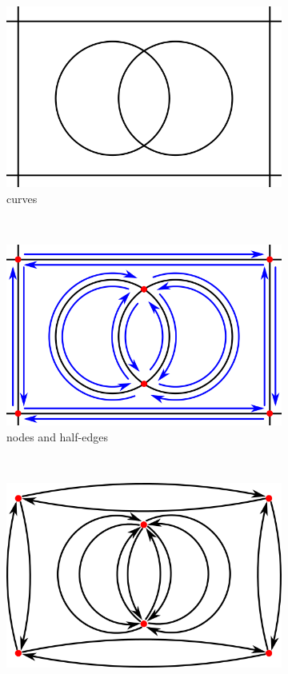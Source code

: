 \begin{figure}%
  \centering
  \begin{subfigure}{.32\textwidth}
    \includegraphics[width=\textwidth]{figures/subd_mdg_a.png}
    \caption{curves} \label{subfig:subd_mdg_a}
  \end{subfigure}%
  ~%
  \begin{subfigure}{.32\textwidth}
    \includegraphics[width=\textwidth]{figures/subd_mdg_b.png}
    \caption{nodes and half-edges} \label{subfig:subd_mdg_b}
  \end{subfigure}%
  ~%
  \begin{subfigure}{.32\textwidth}
    \includegraphics[width=\textwidth]{figures/subd_mdg_c.png}

\end{subfigure}
\end{figure}
